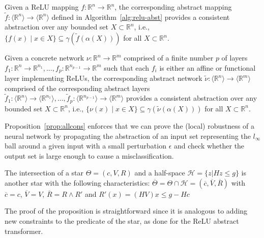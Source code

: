 \begin{proposition}
\label{prop:relucons}
Given a ReLU mapping $f : \mathbb{R}^n \to \mathbb{R}^n$, the
corresponding abstract mapping $\tilde{f} : \langle
\mathbb{R}^n \rangle \to \langle \mathbb{R}^n \rangle$ defined in 
Algorithm~\ref{alg:relu-abst} provides a consistent 
abstraction over any bounded set $X \subset \mathbb{R}^n$, i.e.,
$\{ f(x) \mid x \in X \} \subseteq \gamma(\tilde{f}(\alpha(X)))$ for
all $X \subset \mathbb{R}^n$. 
\end{proposition}


\begin{proposition}
\label{prop:allcons}
Given a concrete network $\nu : \mathbb{R}^n \to \mathbb{R}^m$ comprised 
of a finite number $p$ of layers 
$f_1: \mathbb{R}^n  \to \mathbb{R}^{n_1}, \ldots, f_p: \mathbb{R}^{n_{p-1}} \to \mathbb{R}^{m}$ 
such that each $f_i$ is either an affine or functional layer implementing 
ReLUs, the corresponding abstract network
$\tilde{\nu} : \langle \mathbb{R}^n \rangle \to \langle \mathbb{R}^m \rangle$ 
comprised of the corresponding abstract layers 
$\tilde{f}_1: \langle \mathbb{R}^n \rangle  \to \langle \mathbb{R}^{n_1} \rangle, \ldots, 
\tilde{f}_p: \langle \mathbb{R}^{n_{p-1}} \rangle \to \langle \mathbb{R}^{m} \rangle$ 
provides a consistent abstraction over any bounded set $X \subset \mathbb{R}^n$, i.e.,
$\{ \nu(x) \mid x \in X \} \subseteq \gamma(\tilde{\nu}(\alpha(X)))$ for
all $X \subset \mathbb{R}^n$. 
\end{proposition}

Proposition~\ref{prop:allcons} enforces that we can prove the (local) robustness of
a neural network by propagating the abstraction of an input set representing the
$l_{\infty}$ ball around a given input with a small perturbation $\epsilon$ and check
whether the output set is large enough to cause a misclassification.

\begin{proposition}
\label{prop:halfspace-intersect}
The intersection of a star $\Theta = (c,V,R)$ and a half-space 
$\mathcal{H} = \{z | Hz \leq g\}$ is another star with the following characteristics:
$\overline{\Theta} = \Theta \cap \mathcal{H} = (\overline{c},\overline{V},
\overline{R})$ with $\overline{c} = c$, $\overline{V} = V$,
$\overline{R} = R \wedge R'$ and $R'(x) = (H V)x \leq g - H c$
\end{proposition}
The proof of the proposition is straightforward since it is analogous to 
adding new constraints to the predicate of the star, as done for the ReLU 
abstract transformer.

